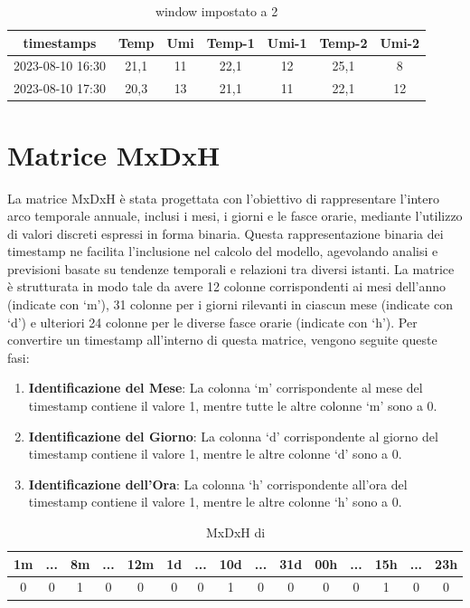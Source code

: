 \documentclass{rapportECL}
\begin{document}
\begin{table}[H]
  \centering
  \begin{tabular}{|*{7}{c|}}
  \hline
  timestamps & Temp & Umi & Temp-1 & Umi-1 & Temp-2 & Umi-2\\
  \hline
  2023-08-10 16:30 & 21,1 & 11 & 22,1 & 12 & 25,1 & 8\\
  \hline
  2023-08-10 17:30 & 20,3 & 13 & 21,1 & 11 & 22,1 & 12\\
  \hline
  
  \end{tabular}
  
  \caption{window impostato a 2}
\end{table}

\section{Matrice MxDxH}

La matrice MxDxH è stata progettata con l'obiettivo di rappresentare l'intero arco temporale annuale, inclusi i mesi, i giorni e le fasce orarie, 
mediante l'utilizzo di valori discreti espressi in forma binaria. Questa rappresentazione binaria dei timestamp ne facilita l'inclusione nel calcolo del modello, 
agevolando analisi e previsioni basate su tendenze temporali e relazioni tra diversi istanti.
La matrice è strutturata in modo tale da avere 12 colonne corrispondenti ai mesi 
dell'anno (indicate con `m'), 31 colonne per i giorni rilevanti in ciascun mese (indicate con `d') e ulteriori 24 colonne per le diverse fasce orarie (indicate con `h'). 
Per convertire un timestamp all'interno di questa matrice, vengono seguite queste fasi:

\begin{enumerate}
  \item \textbf{Identificazione del Mese}: La colonna `m' corrispondente al mese del timestamp contiene il valore 1, mentre tutte le altre colonne `m' sono a 0.
  \item \textbf{Identificazione del Giorno}: La colonna `d' corrispondente al giorno del timestamp contiene il valore 1, mentre le altre colonne `d' sono a 0.
  \item \textbf{Identificazione dell'Ora}: La colonna `h' corrispondente all'ora del timestamp contiene il valore 1, mentre le altre colonne `h' sono a 0.
\end{enumerate}


\begin{table}[h]\centering
  \begin{tabular}{|*{15}{c|}}
  
  \hline
  1m & ... & 8m & ... & 12m & 1d & ... & 10d & ... & 31d & 00h & ... & 15h & ... & 23h\\
  \hline
  0 & 0 & 1 & 0 & 0 & 0 & 0 & 1 & 0 & 0 & 0 & 0 & 1 & 0 & 0\\
  \hline
  
  \end{tabular}
  
  \caption{MxDxH di  }
\end{table}
\end{document}
